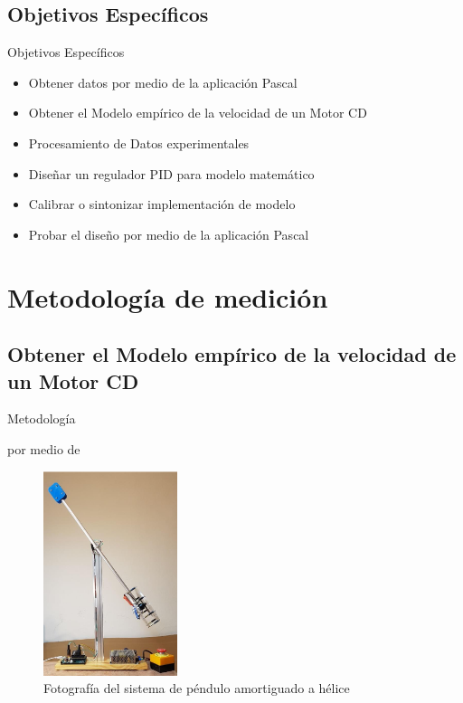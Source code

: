 \documentclass[mathserif,spanish]{beamer}
\begin{document}
\subsection{Objetivos Específicos}
    \begin{frame}{Objetivos Específicos}
        \begin{itemize}
            \item Obtener datos por medio de la aplicación Pascal
            \item Obtener el Modelo empírico de la velocidad de un Motor CD
            \item Procesamiento de Datos experimentales
            \item Diseñar un regulador PID para modelo matemático 
            \item Calibrar o sintonizar implementación de modelo
            \item Probar el diseño por medio de la aplicación Pascal
        \end{itemize}
    \end{frame}   %

\section{Metodología de medición}   %
    \subsection{Obtener el Modelo empírico de la velocidad de un Motor CD}
        \begin{frame}{Metodología}
             \item 
           por medio de         
\begin{figure}[!h]
\centering
\includegraphics[width=0.35\textwidth]{L02img01.png}
\caption{Fotografía del sistema de péndulo amortiguado a hélice}
\label{fig:comp_cd}
\end{figure}
        
       \end{frame}
\end{document}
